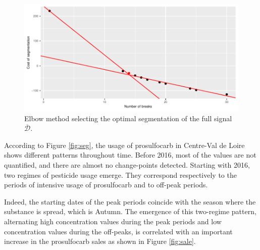 \begin{figure}[htbp]
  \centering
  \includegraphics[]{figs/Chap5/Elbow_seg-1.pdf}
  \caption{Elbow method selecting the optimal segmentation of the full signal $\overline{\mathcal{D}}$.}
  \label{fig:elb_seg}
\end{figure} 

According to Figure \ref{fig:seg}, the usage of prosulfocarb in Centre-Val de Loire shows different patterns throughout time. Before 2016, most of the values are not quantified, and there are almost no change-points detected. Starting with 2016, two regimes of pesticide usage emerge. They correspond respectively to the periods of intensive usage of prosulfocarb and to off-peak periods. 

Indeed, the starting dates of the peak periods coincide with the season where the substance is spread, which is Autumn. The emergence of this two-regime pattern, alternating high concentration values during the peak periods and low concentration values during the off-peaks, is correlated with an important increase in the prosulfocarb sales as shown in Figure \ref{fig:sale}. 

